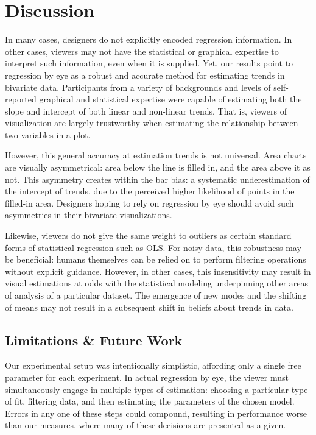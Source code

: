 \documentclass{sigchi}
\begin{document}
\section{Discussion}

In many cases, designers do not explicitly encoded regression information. In other cases, viewers may not have the statistical or graphical expertise to interpret such information, even when it is supplied. Yet, our results point to regression by eye as a robust and accurate method for estimating trends in bivariate data. Participants from a variety of backgrounds and levels of self-reported graphical and statistical expertise were capable of estimating both the slope and intercept of both linear and non-linear trends. That is, viewers of visualization are largely trustworthy when estimating the relationship between two variables in a plot.

However, this general accuracy at estimation trends is not universal. Area charts are visually asymmetrical: area below the line is filled in, and the area above it as not. This asymmetry creates within the bar bias: a systematic underestimation of the intercept of trends, due to the perceived higher likelihood of points in the filled-in area. Designers hoping to rely on regression by eye should avoid such asymmetries in their bivariate visualizations.

Likewise, viewers do not give the same weight to outliers as certain standard forms of statistical regression such as OLS. For noisy data, this robustness may be beneficial: humans themselves can be relied on to perform filtering operations without explicit guidance. However, in other cases, this insensitivity may result in visual estimations at odds with the statistical modeling underpinning other areas of analysis of a particular dataset. The emergence of new modes and the shifting of means may not result in a subsequent shift in beliefs about trends in data.

\subsection{Limitations \& Future Work}

Our experimental setup was intentionally simplistic, affording only a single free parameter for each experiment. In actual regression by eye, the viewer must simultaneously engage in multiple types of estimation: choosing a particular type of fit, filtering data, and then estimating the parameters of the chosen model. Errors in any one of these steps could compound, resulting in performance worse than our measures, where many of these decisions are presented as a given. 
\end{document}
